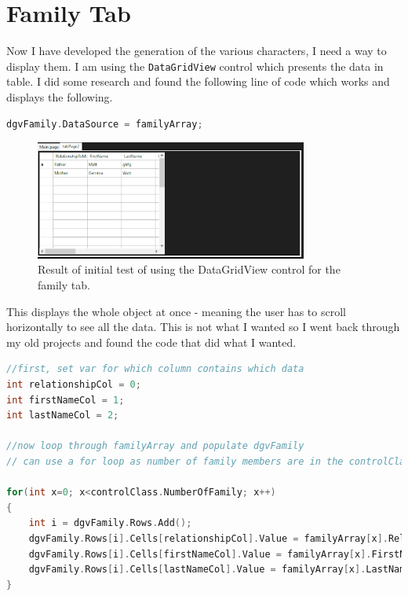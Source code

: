\section{Family Tab}
Now I have developed the generation of the various characters, I need a way to display them. I am using the \verb|DataGridView| control which presents the data in table. I did some research and found the following line of code which works and displays the following.
\begin{lstlisting}[language=c, style=csharp, caption=First attempt at using a DataGridView control to show the family tab.]
dgvFamily.DataSource = familyArray;
\end{lstlisting}
\begin{figure}[H]
    \centering
    \includegraphics[width=0.8\textwidth]{images/implementation/familyTabInitialTest.png}
    \caption{Result of initial test of using the DataGridView control for the family tab.}
    \label{fig:implementation-familyTabInitialTest}
\end{figure}
\noindent This displays the whole object at once - meaning the user has to scroll horizontally to see all the data. This is not what I wanted so I went back through my old projects and found the code that did what I wanted.
\begin{lstlisting}[language=c, style=csharp, caption=Improved method of populating dgvFamily]
 //first, set var for which column contains which data
int relationshipCol = 0;
int firstNameCol = 1;
int lastNameCol = 2;

//now loop through familyArray and populate dgvFamily
// can use a for loop as number of family members are in the controlClass

for(int x=0; x<controlClass.NumberOfFamily; x++)
{
    int i = dgvFamily.Rows.Add();
    dgvFamily.Rows[i].Cells[relationshipCol].Value = familyArray[x].RelationshipToMain;
    dgvFamily.Rows[i].Cells[firstNameCol].Value = familyArray[x].FirstName;
    dgvFamily.Rows[i].Cells[lastNameCol].Value = familyArray[x].LastName;
}
\end{lstlisting}
